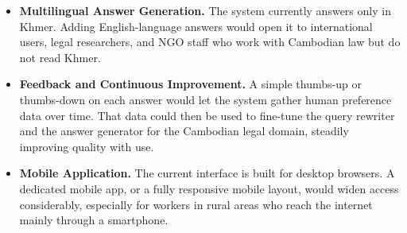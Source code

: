 \begin{itemize}
    \item \textbf{Multilingual Answer Generation.} The system currently answers only in
    Khmer. Adding English-language answers would open it to international users, legal
    researchers, and NGO staff who work with Cambodian law but do not read Khmer.

    \item \textbf{Feedback and Continuous Improvement.} A simple thumbs-up or thumbs-down on
    each answer would let the system gather human preference data over time. That data could
    then be used to fine-tune the query rewriter and the answer generator for the Cambodian
    legal domain, steadily improving quality with use.

    \item \textbf{Mobile Application.} The current interface is built for desktop browsers. A
    dedicated mobile app, or a fully responsive mobile layout, would widen access
    considerably, especially for workers in rural areas who reach the internet mainly through
    a smartphone.

\end{itemize}
